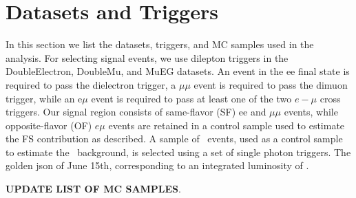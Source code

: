 \clearpage

\section{Datasets and Triggers}
\label{sec:datasets}

In this section we list the datasets, triggers, and MC samples used in the analysis. For selecting signal
events, we use dilepton triggers in the DoubleElectron, DoubleMu, and MuEG datasets. 
An event in the ee final state is required to pass the dielectron trigger, a 
$\mu\mu$ event is required to pass the dimuon trigger, while an e$\mu$ event is required to pass at least one 
of the two $e-\mu$ cross triggers. Our signal region consists of same-flavor (SF) ee and $\mu\mu$ events, while
opposite-flavor (OF) $e\mu$ events are retained in a control sample used to estimate the 
FS contribution as described. A sample of \gjets\ events, used as a control sample to estimate the \zjets\
background, is selected using a set of single photon triggers.
The golden json of June 15th, corresponding to an integrated luminosity of \lumi. 

{\bf UPDATE LIST OF MC SAMPLES}.

